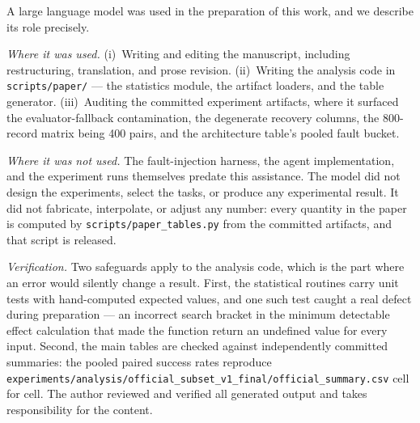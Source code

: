 A large language model was used in the preparation of this work, and we describe
its role precisely.

\emph{Where it was used.} (i)~Writing and editing the manuscript, including
restructuring, translation, and prose revision. (ii)~Writing the analysis code in
\texttt{scripts/paper/} --- the statistics module, the artifact loaders, and the
table generator. (iii)~Auditing the committed experiment artifacts, where it
surfaced the evaluator-fallback contamination, the degenerate recovery columns,
the 800-record matrix being 400 pairs, and the architecture table's pooled
fault bucket.

\emph{Where it was not used.} The fault-injection harness, the agent
implementation, and the experiment runs themselves predate this assistance. The
model did not design the experiments, select the tasks, or produce any
experimental result. It did not fabricate, interpolate, or adjust any number: every
quantity in the paper is computed by \texttt{scripts/paper\_tables.py} from the
committed artifacts, and that script is released.

\emph{Verification.} Two safeguards apply to the analysis code, which is the part
where an error would silently change a result. First, the statistical routines
carry unit tests with hand-computed expected values, and one such test caught a
real defect during preparation --- an incorrect search bracket in the minimum
detectable effect calculation that made the function return an undefined value for
every input. Second, the main tables are checked against independently committed
summaries: the pooled paired success rates reproduce
\texttt{experiments/analysis/official\_subset\_v1\_final/official\_summary.csv}
cell for cell. The author reviewed and verified all generated output and takes
responsibility for the content.
